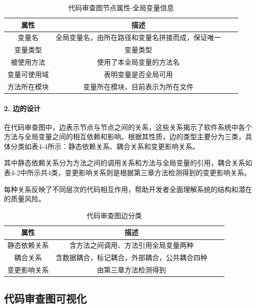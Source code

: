 \begin{table}[htbp]
\caption{代码审查图节点属性-全局变量信息}
\vspace{0.5em}\centering\wuhao
\begin{tabular}{cccc}
\toprule
    属性 & 描述 \\
\midrule
变量名 & 全局变量名，由所在路径和变量名拼接而成，保证唯一  \\
变量类型 & 变量类型   \\
被使用方法 & 使用了本全局变量的方法名   \\
变量可使用域 & 表明变量是否全局可用   \\
方法所在模块 &  变量所在模块，目前表示为所在文件  \\  
\bottomrule
\end{tabular}
\end{table}


\paragraph{2. 边的设计}

在代码审查图中，边表示节点与节点之间的关系，这些关系揭示了软件系统中各个方法与全局变量之间的相互依赖和影响。根据其性质，边的类型主要分为三类，具体分类如表4-4所示：静态依赖关系、耦合关系和变更影响关系。

其中静态依赖关系分为方法之间的调用关系和方法与全局变量的引用，耦合关系如表4-2中所示共4类，变更影响关系则是根据第三章方法检测得到的变更影响关系。

每种关系反映了不同层次的代码相互作用，帮助开发者全面理解系统的结构和潜在的质量风险。

\begin{table}[htbp]
\caption{代码审查图边分类}
\vspace{0.5em}\centering\wuhao
\begin{tabular}{cccc}
\toprule
属性 & 描述 \\
\midrule
静态依赖关系 & 含方法之间调用、方法引用全局变量两种  \\
耦合关系 & 含数据耦合，标记耦合，外部耦合，公共耦合四种   \\
变更影响关系 & 由第三章方法检测得到  \\
\bottomrule
\end{tabular}
\end{table}



\subsection{代码审查图可视化}

